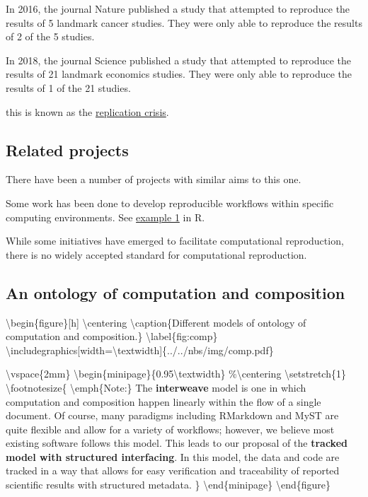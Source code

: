 In 2016, the journal Nature published a study that attempted to reproduce the results of 5 landmark cancer studies. They were only able to reproduce the results of 2 of the 5 studies.

In 2018, the journal Science published a study that attempted to reproduce the results of 21 landmark economics studies. They were only able to reproduce the results of 1 of the 21 studies.

this is known as the \href{https://en.wikipedia.org/wiki/Replication\_crisis}{replication crisis}.

\hypertarget{related-projects}{%
\subsection{Related projects}\label{related-projects}}

There have been a number of projects with similar aims to this one.

Some work has been done to develop reproducible workflows within specific computing environments. See \href{https://mine-cetinkaya-rundel.github.io/improve-repro-workflow-reproducibilitea-2020/}{example 1} in R.

While some initiatives have emerged to facilitate computational reproduction, there is no widely accepted standard for computational reproduction. 

\hypertarget{an-ontology-of-computation-and-composition}{%
\subsection{An ontology of computation and composition}\label{an-ontology-of-computation-and-composition}}

\textbackslash{}begin\{figure\}[h]
\textbackslash{}centering
\textbackslash{}caption\{Different models of ontology of computation and composition.\}
\textbackslash{}label\{fig:comp\}
\textbackslash{}includegraphics[width=\textbackslash{}textwidth]\{../../nbs/img/comp.pdf\}

\textbackslash{}vspace\{2mm\}
\textbackslash{}begin\{minipage\}\{0.95\textbackslash{}textwidth\}
\%\textbackslash{}centering
\textbackslash{}setstretch\{1\}
\textbackslash{}footnotesize\{
\textbackslash{}emph\{Note:\} The \textbf{interweave} model is one in which computation and composition happen linearly within the flow of a single document. Of course, many paradigms including RMarkdown and MyST are quite flexible and allow for a variety of workflows; however, we believe most existing software follows this model. This leads to our proposal of the \textbf{tracked model with structured interfacing}. In this model, the data and code are tracked in a way that allows for easy verification and traceability of reported scientific results with structured metadata.
\}
\textbackslash{}end\{minipage\}
\textbackslash{}end\{figure\}


